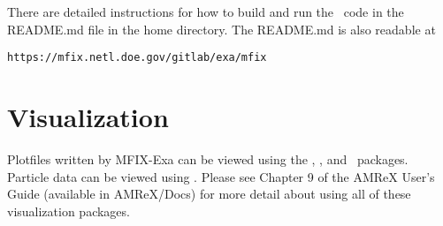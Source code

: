 There are detailed instructions for how to build and run the \mfix\ code in
the README.md file in the home directory.   The README.md is also readable at

\begin{verbatim}
https://mfix.netl.doe.gov/gitlab/exa/mfix
\end{verbatim}

\section{Visualization}

Plotfiles written by MFIX-Exa can be viewed using the 
\visit, \paraview, and \yt\ packages.  Particle data can be viewed using \paraview.
Please see Chapter 9 of the AMReX User's Guide (available in AMReX/Docs)
for more detail about using all of these visualization packages.
